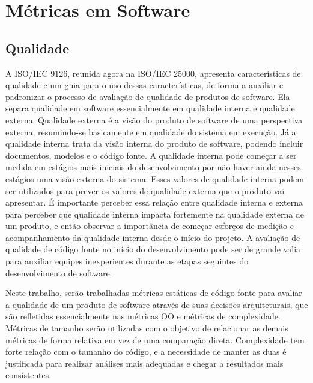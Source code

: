 \chapter{Métricas em Software}
\label{cap:metricas}

\section{Qualidade}

A ISO/IEC 9126, reunida agora na ISO/IEC 25000, apresenta características de qualidade e um guia para o uso dessas características, de forma a auxiliar e padronizar o processo de avaliação de qualidade de produtos de software. Ela separa qualidade em software essencialmente em qualidade interna e qualidade externa. Qualidade externa é a visão do produto de software de uma perspectiva externa, resumindo-se basicamente em qualidade do sistema em execução. Já a qualidade interna trata da visão interna do produto de software, podendo incluir documentos, modelos e o código fonte. A qualidade interna pode começar a ser medida em estágios mais iniciais do desenvolvimento por não haver ainda nesses estágios uma visão externa do sistema. Esses valores de qualidade interna podem ser utilizados para prever os valores de qualidade externa que o produto vai apresentar. É importante perceber essa relação entre qualidade interna e externa para perceber que qualidade interna impacta fortemente na qualidade externa de um produto, e então observar a importância de começar esforços de medição e acompanhamento da qualidade interna desde o início do projeto. A avaliação de qualidade de código fonte no início do desenvolvimento pode ser de grande valia para auxiliar equipes inexperientes durante as etapas seguintes do desenvolvimento de software.

Neste trabalho, serão trabalhadas métricas estáticas de código fonte para avaliar a qualidade de um produto de software através de suas decisões arquiteturais, que são refletidas essencialmente nas métricas OO e métricas de complexidade. Métricas de tamanho serão utilizadas com o objetivo de relacionar as demais métricas de forma relativa em vez de uma comparação direta. Complexidade tem forte relação com o tamanho do código, e a necessidade de manter as duas é justificada para realizar análises mais adequadas e chegar a resultados mais consistentes.

